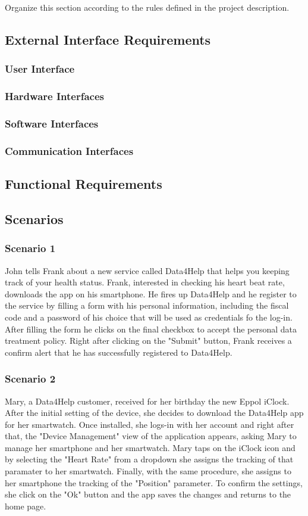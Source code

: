 Organize this section according to the rules defined in the project description. 
\subsection{External Interface Requirements}
\subsubsection{User Interface}
\subsubsection{Hardware Interfaces}
\subsubsection{Software Interfaces}
\subsubsection{Communication Interfaces}
\subsection{Functional Requirements}
\subsection{Scenarios}
\subsubsection{Scenario 1}
John tells Frank about a new service called Data4Help that helps you keeping track of your health status. Frank, interested in checking his heart beat rate, downloads the app on his smartphone. He fires up  Data4Help and he register to the service by filling a form with his personal information, including the fiscal code and a password of his choice that will be used as credentials fo the log-in. 
After filling the form he clicks on the final checkbox to accept the personal data treatment policy.
Right after clicking on the "Submit" button, Frank receives a confirm alert that he has successfully registered to Data4Help.
\subsubsection{Scenario 2}
Mary, a Data4Help customer, received for her birthday the new Eppol iClock. After the initial setting of the device, she decides to download the Data4Help app for her smartwatch. Once installed, she logs-in with her account and right after that, the "Device Management" view of the application appears, asking Mary to manage her smartphone and her smartwatch. Mary taps on the iClock icon and by selecting the "Heart Rate" from a dropdown she assigns the tracking of that paramater to her smartwatch. Finally, with the same procedure, she assigns to her smartphone the tracking of the "Position" parameter.
To confirm the settings, she click on the "Ok" button and the app saves the changes and returns to the home page.
